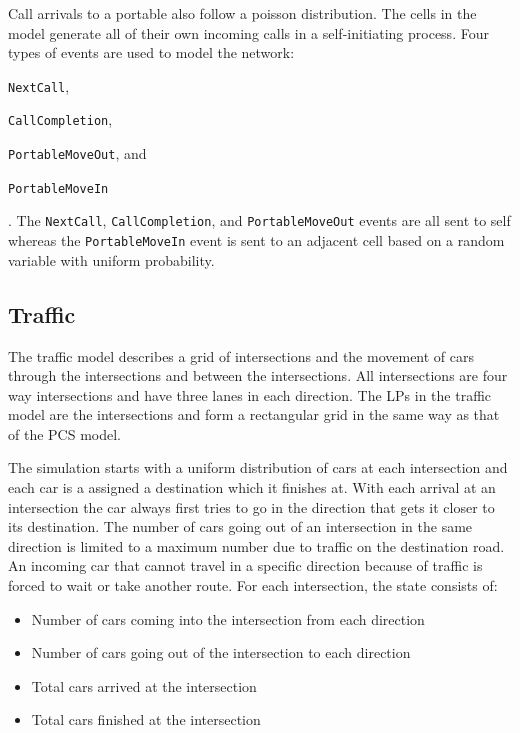 \documentclass[11pt]{book}
\begin{document}
\noindent
Call arrivals to a portable also follow a poisson distribution.  The cells in the model
generate all of their own incoming calls in a self-initiating process.
Four types of events are used to model the network: \begin{inparaenum}[(1)] \item \texttt{NextCall},
\item \texttt{CallCompletion}, \item \texttt{PortableMoveOut}, and \item \texttt{PortableMoveIn}
\end{inparaenum}.  The \texttt{NextCall}, \texttt{CallCompletion}, and \texttt{PortableMoveOut}
events are all sent to self whereas the \texttt{PortableMoveIn} event is sent to an adjacent
cell based on a random variable with uniform probability.

\subsection{Traffic}

The traffic model describes a grid of intersections and the movement of cars through
the intersections and between the intersections.  All intersections are four way intersections
and have three lanes in each direction.  The LPs in the traffic model are the intersections
and form a rectangular grid in the same way as that of the PCS model.

The simulation starts with a uniform distribution of cars at each intersection and each
car is a assigned a destination which it finishes at.  With each arrival at an intersection
the car always first tries to go in the direction that gets it closer to its destination.
The number of cars going out of an intersection in the same direction is limited to a
maximum number due to traffic on the destination road.  An incoming car that cannot travel in
a specific direction because of traffic is forced to wait or take another route.  For each
intersection, the state consists of:

\begin{itemize}
    \item Number of cars coming into the intersection from each direction
    \item Number of cars going out of the intersection to each direction
    \item Total cars arrived at the intersection
    \item Total cars finished at the intersection
\end{itemize}
\end{document}
